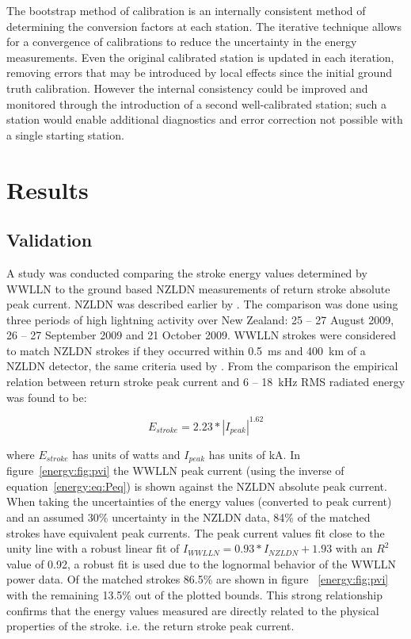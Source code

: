The bootstrap method of calibration is an internally consistent method of determining the conversion factors at each station.
The iterative technique allows for a convergence of calibrations to reduce the uncertainty in the energy measurements.
Even the original calibrated station is updated in each iteration, removing errors that may be introduced by local effects since the initial ground truth calibration.
However the internal consistency could be improved and monitored through the introduction of a second well-calibrated station; such a station would enable additional diagnostics and error correction not possible with a single starting station.

\section{Results}

\subsection{Validation}

A study was conducted comparing the stroke energy values determined by WWLLN to the ground based NZLDN measurements of return stroke absolute peak current. NZLDN was described earlier by \citet{Rodger2006}.
The comparison was done using three periods of high lightning activity over New Zealand: 25 -- 27 August 2009, 26 -- 27 September 2009 and 21 October 2009.
WWLLN strokes were considered to match NZLDN strokes if they occurred within 0.5~ms and 400~km of a NZLDN detector, the same criteria used by \citet{Rodger2006}.
From the comparison the empirical relation between return stroke peak current and 6 -- 18~kHz RMS radiated energy was found to be: 

\begin{equation}
E_{stroke} = 2.23 * |I_{peak}|^{1.62}
\label{energy:eq:Peq}
\end{equation}

where $E_{stroke}$ has units of watts and $I_{peak}$ has units of kA.
In figure~\ref{energy:fig:pvi} the WWLLN peak current (using the inverse of equation~\ref{energy:eq:Peq}) is shown against the NZLDN absolute peak current.
When taking the uncertainties of the energy values (converted to peak current) and an assumed 30\% uncertainty in the NZLDN data, 84\% of the matched strokes have equivalent peak currents.
The peak current values fit close to the unity line with a robust linear fit of $I_{WWLLN}=0.93*I_{NZLDN}+1.93$ with an $R^2$ value of 0.92, a robust fit is used due to the lognormal behavior of the WWLLN power data.
Of the matched strokes 86.5\% are shown in figure~ \ref{energy:fig:pvi} with the remaining 13.5\% out of the plotted bounds.
This strong relationship confirms that the energy values measured are directly related to the physical properties of the stroke. i.e. the return stroke peak current.

